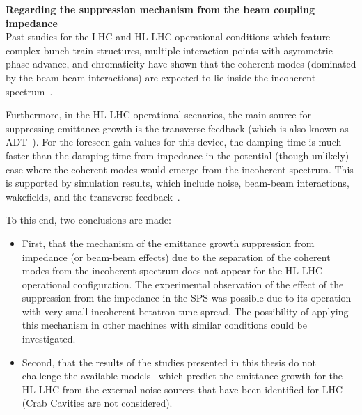 \textbf{Regarding the suppression mechanism from the beam coupling impedance}\\
Past studies for the LHC and HL-LHC operational conditions which feature complex bunch train structures, multiple interaction points with asymmetric phase advance, and chromaticity have shown that the coherent modes (dominated by the beam-beam interactions) are expected to lie inside the incoherent spectrum~\cite{Pieloni:1259906, Buffat:2712068}.

Furthermore, in the HL-LHC operational scenarios, the main source for suppressing emittance growth is the transverse feedback (which is also known as ADT~\cite{lhc_adt_info_presentation}). For the foreseen gain values for this device, the damping time is much faster than the damping time from impedance in the potential (though unlikely) case where the coherent modes would emerge from the incoherent spectrum. This is supported by simulation results, which include noise, beam-beam interactions, wakefields, and the transverse feedback~\cite{Buffat:2712068}. %

To this end, two conclusions are made: 
\begin{itemize}
    \item First, that the mechanism of the emittance growth suppression from impedance (or beam-beam effects) due to the separation of the coherent modes from the incoherent spectrum does not appear for the HL-LHC operational configuration. The experimental observation of the effect of the suppression from the impedance in the SPS was possible due to its operation with very small incoherent betatron tune spread. The possibility of applying this mechanism in other machines with similar conditions could be investigated. %
    \item Second, that the results of the studies presented in this thesis do not challenge the available models~\cite{van_kamper_presentation_xavier_theory} which predict the emittance growth for the HL-LHC from the external noise sources that have been identified for LHC~\cite{Buffat:2712068} (Crab Cavities are not considered).
\end{itemize}



